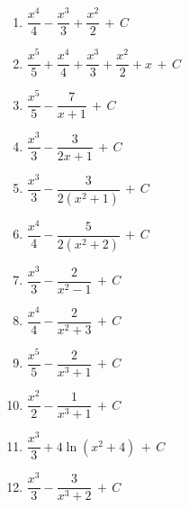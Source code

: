 \documentclass[12pt, letterpaper]{article}
\newcommand{\CC}{\,+\,C}
\begin{document}
\begin{enumerate}[label=\textbf{\arabic*.}, leftmargin=*, itemsep=5pt]
  \item $\dfrac{x^{4}}{4} - \dfrac{x^{3}}{3} + \dfrac{x^{2}}{2} \CC$

  \item $\dfrac{x^{5}}{5} + \dfrac{x^{4}}{4} + \dfrac{x^{3}}{3} + \dfrac{x^{2}}{2} + x \CC$

  \item $\dfrac{x^{5}}{5} - \dfrac{7}{x+1} \CC$

  \item $\dfrac{x^{3}}{3} - \dfrac{3}{2x+1} \CC$

  \item $\dfrac{x^{3}}{3} - \dfrac{3}{2(x^{2}+1)} \CC$

  \item $\dfrac{x^{4}}{4} - \dfrac{5}{2(x^{2}+2)} \CC$

  \item $\dfrac{x^{3}}{3} - \dfrac{2}{x^{2}-1} \CC$

  \item $\dfrac{x^{4}}{4} - \dfrac{2}{x^{2}+3} \CC$

  \item $\dfrac{x^{5}}{5} - \dfrac{2}{x^{3}+1} \CC$

  \item $\dfrac{x^{2}}{2} - \dfrac{1}{x^{3}+1} \CC$

  \item $\dfrac{x^{3}}{3} + 4\ln(x^{2}+4) \CC$

  \item $\dfrac{x^{3}}{3} - \dfrac{3}{x^{3}+2} \CC$

\end{enumerate}
\fi
\end{document}
